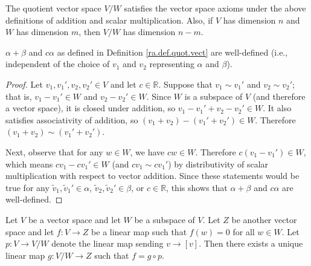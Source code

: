 \begin{proposition}

The quotient vector space \(V/W\) satisfies the vector space axioms under the above definitions of addition and scalar multiplication. Also, if \(V\) has dimension \(n\) and \(W\) has dimension \(m\), then \(V/W\) has dimension \(n-m\).

\end{proposition}

\begin{proposition}

\(\alpha + \beta\) and \(c \alpha\) as defined in Definition \ref{ra.def.quot.vect} are well-defined (i.e., independent of the choice of \(v_1\) and \(v_2\) representing \(\alpha\) and \(\beta\)).

\end{proposition}

\begin{proof}

Let \(v_1, v_1', v_2, v_2' \in V\) and let \(c \in \mathbb{R}\). Suppose that \(v_1 \sim v_1'\) and \(v_2 \sim v_2'\); that is, \(v_1 - v_1' \in W\) and \(v_2 - v_2' \in W\). Since \(W\) is a subspace of \(V\) (and therefore a vector space), it is closed under addition, so \(v_1 - v_1' + v_2 - v_2' \in W\). It also satisfies associativity of addition, so \((v_1 + v_2) - (v_1' + v_2') \in W\). Therefore \((v_1 + v_2) \sim (v_1' + v_2')\).

Next, observe that for any \(w \in W\), we have \(cw \in W\). Therefore \(c(v_1 - v_1') \in W\), which means \(c v_1 - c v_1' \in W\) (and \(c v_1 \sim c v_1'\)) by distributivity of scalar multiplication with respect to vector addition. Since these statements would be true for any \(\tilde{v}_1, \tilde{v}_1' \in \alpha\), \(\tilde{v}_2, \tilde{v}_2' \in \beta\), or \(c \in \mathbb{R}\), this shows that \(\alpha + \beta\) and \(c \alpha\) are well-defined.

\end{proof}

\begin{proposition}

Let \(V\) be a vector space and let \(W\) be a subspace of \(V\). Let \(Z\) be another vector space and let \(f: V \to Z\) be a linear map such that \(f(w) = 0\) for all \(w \in W\). Let \(p: V \to V/W\) denote the linear map sending \(v \to [v]\). Then there exists a unique linear map \(g: V/W \to Z\) such that \(f = g \circ p\).

\end{proposition}

